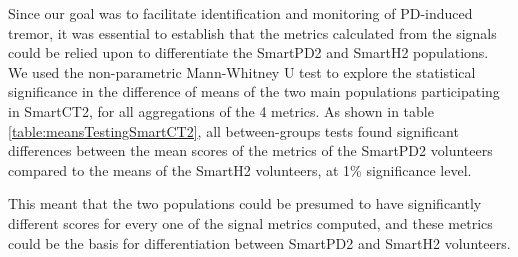 
Since our goal was to facilitate identification and monitoring of \gls{PD}-induced tremor, it was essential to establish that the metrics calculated from the signals could be relied upon to differentiate the \gls{SmartPD2} and \gls{SmartH2} populations. We used the non-parametric Mann-Whitney U test to explore the statistical significance in the difference of means of the two main populations participating in \gls{SmartCT2}, for all aggregations of the 4 metrics. As shown in table \ref{table:meansTestingSmartCT2}, all between-groups tests found significant differences between the mean scores of the metrics of the \gls{SmartPD2} volunteers compared to the means of the \gls{SmartH2} volunteers, at 1\% significance level.  


This meant that the two populations could be presumed to have significantly different scores for every one of the signal metrics computed, and these metrics could be the basis for differentiation between \gls{SmartPD2} and \gls{SmartH2} volunteers.

